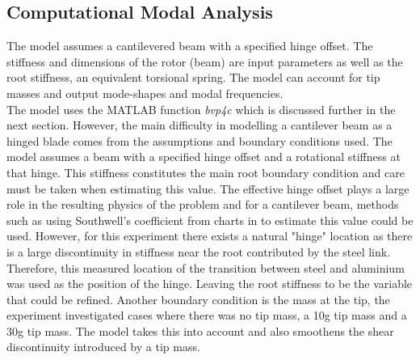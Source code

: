 \documentclass[11pt]{article}
\begin{document}
\subsection{Computational Modal Analysis}
The model assumes a cantilevered beam with a specified hinge offset. The stiffness and dimensions of the rotor (beam) are input parameters as well as the root stiffness, an equivalent torsional spring. The model can account for tip masses and output mode-shapes and modal frequencies.\\
The model uses the MATLAB function \textit{bvp4c} which is discussed further in the next section.
However, the main difficulty in modelling a cantilever beam as a hinged blade comes from the assumptions and boundary conditions used. The model assumes a beam with a specified hinge offset and a rotational stiffness at that hinge. This stiffness constitutes the main root boundary condition and care must be taken when estimating this value. The effective hinge offset plays a large role in the resulting physics of the problem and for a cantilever beam, methods such as using Southwell's coefficient from charts in \cite{charts} to estimate this value could be used. However, for this experiment there exists a natural "hinge" location as there is a large discontinuity in stiffness near the root contributed by the steel link. Therefore, this measured location of the transition between steel and aluminium was used as the position of the hinge. Leaving the root stiffness to be the variable that could be refined. Another boundary condition is the mass at the tip, the experiment investigated cases where there was no tip mass, a 10g tip mass and a 30g tip mass. The model takes this into account and also smoothens the shear discontinuity introduced by a tip mass.
\end{document}
